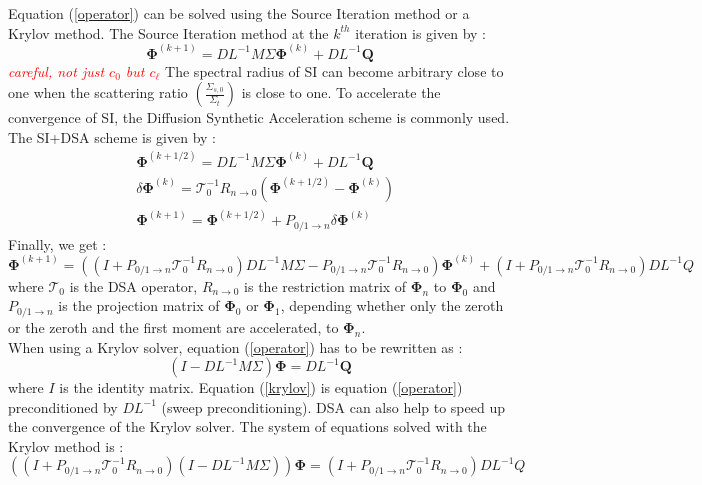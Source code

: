 \documentclass[preprint,10pt]{elsarticle}
\newcommand\bs{\boldsymbol}
\renewcommand{\(}{\left(}
\renewcommand{\)}{\right)}
\renewcommand{\[}{\left[}
\renewcommand{\]}{\right]}
\newcommand{\tri}[1]{\textcolor{red}{{\it #1}}}
\begin{document}
Equation (\ref{operator}) can be solved using the Source Iteration method or a
Krylov method. The Source Iteration method at the $k^{th}$ iteration is given
by :
\begin{equation}
\bs{\Phi}^{(k+1)} = DL^{-1}M\Sigma \bs{\Phi}^{(k)} + DL^{-1}\bs{Q}
\end{equation}
\tri{careful, not just $c_0$ but $c_\ell$}
The spectral radius of SI can become arbitrary close to one when the
scattering ratio $\(\frac{\Sigma_{s,0}}{\Sigma_t}\)$ is close to one. 
To accelerate the convergence of SI, the Diffusion Synthetic
Acceleration scheme \cite{adams} is commonly used. The SI+DSA scheme is given by :
\begin{align}
&\bs{\Phi}^{(k+1/2)} = DL^{-1}M\Sigma\bs{\Phi}^{(k)} + DL^{-1}\bs{Q}\\
&\delta\bs{\Phi}^{(k)} = \mathcal{T}_0^{-1} R_{n\rightarrow 0} 
\(\bs{\Phi}^{(k+1/2)}-\bs{\Phi}^{(k)}\)\\
&\bs{\Phi}^{(k+1)} = \bs{\Phi}^{(k+1/2)} + P_{0/1 \rightarrow n} \delta
\bs{\Phi}^{(k)}
\end{align}
Finally, we get :
\begin{equation}
\bs{\Phi}^{(k+1)} = \((I+P_{0/1\rightarrow n} \mathcal{T}_0^{-1} R_{n\rightarrow 0} )
DL^{-1}M\Sigma-P_{0/1\rightarrow n}\mathcal{T}_0^{-1} R_{n\rightarrow 0}\)
\bs{\Phi}^{(k)} + (I+P_{0/1\rightarrow n}\mathcal{T}_0^{-1}
R_{n\rightarrow 0})DL^{-1} Q
\end{equation}
where $\mathcal{T}_0$ is the DSA operator, $R_{n\rightarrow 0}$ is the
restriction matrix of $\bs{\Phi}_{n}$ to $\bs{\Phi}_0$ and $P_{0/1 \rightarrow
n}$ is the projection matrix of $\bs{\Phi}_0$ or $\bs{\Phi}_1$, depending
whether only the zeroth or the zeroth and the first moment are accelerated, to
$\bs{\Phi}_n$.\\
When using a Krylov solver, equation (\ref{operator}) has to be rewritten as :
\begin{equation}
(I-DL^{-1}M\Sigma) \bs{\Phi} = DL^{-1}\bs{Q}
\label{krylov}
\end{equation}
where $I$ is the identity matrix. Equation (\ref{krylov}) is equation
(\ref{operator}) preconditioned by $DL^{-1}$ (sweep preconditioning). DSA can also 
help to speed up the convergence of the Krylov solver. The system of equations 
solved with the Krylov method is :
\begin{equation}
\((I+P_{0/1 \rightarrow n}\mathcal{T}_0^{-1} R_{n\rightarrow 0})(I-DL^{-1}M\Sigma)\)
\bs{\Phi} = (I+P_{0/1 \rightarrow n}\mathcal{T}_0^{-1} R_{n\rightarrow 0})DL^{-1}Q
\end{equation}       
\end{document}
